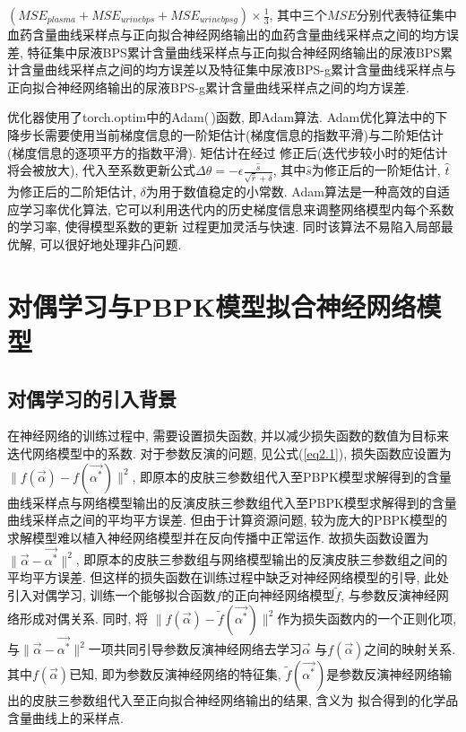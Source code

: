 \documentclass[a4paper,punct=banjiao,twoside]{ctexrep}
\theoremstyle{plain}
\theoremstyle{definition}
\theoremstyle{remark}
\begin{document}
\noindent $(MSE_{plasma}+MSE_{urinebps}+MSE_{urinebpsg})\times \frac{1}{3}$,
其中三个$MSE$分别代表特征集中血药含量曲线采样点与正向拟合神经网络输出的血药含量曲线采样点之间的均方误差, 特征集中尿液BPS累计含量曲线采样点与正向拟合神经网络输出的尿液BPS累计含量曲线采样点之间的均方误差以及特征集中尿液BPS-g累计含量曲线采样点与正向拟合神经网络输出的尿液BPS-g累计含量曲线采样点之间的均方误差.

优化器使用了torch.optim中的Adam(\,)函数, 即Adam算法. 
Adam优化算法中的下降步长需要使用当前梯度信息的一阶矩估计(梯度信息的指数平滑)与二阶矩估计(梯度信息的逐项平方的指数平滑)\cite{24}. 矩估计在经过
修正后(迭代步较小时的矩估计将会被放大), 代入至系数更新公式$\Delta \theta   = -\epsilon \frac{\hat{s}}{\sqrt{\hat{r}} +\delta } $, 其中$\hat{s}$为修正后的一阶矩估计, $\hat{t}$
为修正后的二阶矩估计, $\delta$为用于数值稳定的小常数\cite{24}. Adam算法是一种高效的自适应学习率优化算法, 它可以利用迭代内的历史梯度信息来调整网络模型内每个系数的学习率, 使得模型系数的更新
过程更加灵活与快速\cite{24}. 同时该算法不易陷入局部最优解, 可以很好地处理非凸问题\cite{25}.





\section{对偶学习与PBPK模型拟合神经网络模型}

\subsection{对偶学习的引入背景}
在神经网络的训练过程中, 需要设置损失函数, 并以减少损失函数的数值为目标来迭代网络模型中的系数. 对于参数反演的问题, 见公式(\ref{eq2.1}), 损失函数应设置为$\|f(\vec{\alpha})-f(\vec{\alpha^*}) \|^2 $, 即原本的皮肤三参数组代入至PBPK模型求解得到的含量曲线采样点与网络模型输出的反演皮肤三参数组代入至PBPK模型求解得到的含量曲线采样点之间的平均平方误差. 但由于计算资源问题, 较为庞大的PBPK模型的求解模型难以植入神经网络模型并在反向传播中正常运作. 故损失函数设置为 $\|\vec{\alpha}-\vec{\alpha^*} \|^2 $, 即原本的皮肤三参数组与网络模型输出的反演皮肤三参数组之间的平均平方误差.
但这样的损失函数在训练过程中缺乏对神经网络模型的引导, 此处引入对偶学习, 训练一个能够拟合函数$f$的正向神经网络模型$\tilde{f}$, 与参数反演神经网络形成对偶关系. 同时, 将
$\|f(\vec{\alpha})-\tilde{f}(\vec{\alpha^*}) \|^2 $作为损失函数内的一个正则化项, 与$\|\vec{\alpha}-\vec{\alpha^*} \|^2 $一项共同引导参数反演神经网络去学习$\vec{\alpha}$
与$f(\vec{\alpha})$之间的映射关系. 其中$f(\vec{\alpha})$已知, 即为参数反演神经网络的特征集, $\tilde{f}(\vec{\alpha^*})$是参数反演神经网络输出的皮肤三参数组代入至正向拟合神经网络输出的结果, 含义为
拟合得到的化学品含量曲线上的采样点.
\end{document}
